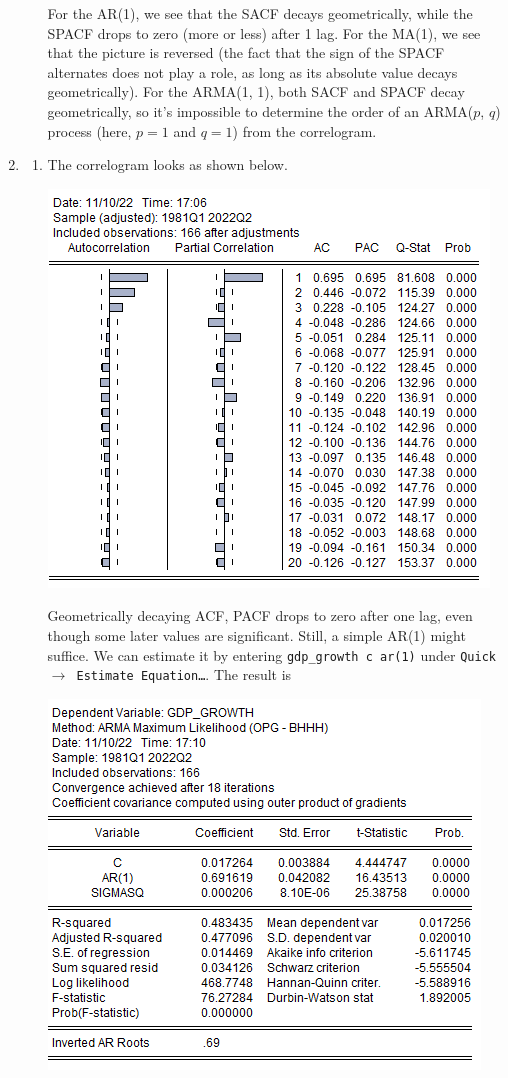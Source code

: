 \documentclass[11pt, a4paper]{article}
\begin{document}
\begin{enumerate}
\begin{enumerate}
\begin{center}
\end{center}
For the AR(1), we see that the SACF decays geometrically, while the SPACF drops to zero (more or less) after 1 lag. For the MA(1), we see that the picture is reversed (the fact that the sign of the SPACF alternates does not play a role, as long as its absolute value decays geometrically). For the ARMA(1, 1), both SACF and SPACF decay geometrically, so it's impossible to determine the order of an ARMA($p$, $q$) process (here, $p=1$ and $q=1$) from the correlogram.
\end{enumerate}
\item
\begin{enumerate}
\item The correlogram looks as shown below.
\begin{center}
\includegraphics[width=.6\textwidth]{corr_gdpg}
\end{center}
Geometrically decaying ACF, PACF drops to zero after one lag, even though some later values are significant. Still, a simple AR(1) might suffice. We can estimate it by entering \verb.gdp_growth c ar(1). under \texttt{Quick$\rightarrow$ Estimate Equation\ldots}. The result is
\begin{center}
\includegraphics[width=.6\textwidth]{ar1_gdpg}

\end{center}
\end{enumerate}
\end{enumerate}
\end{document}
